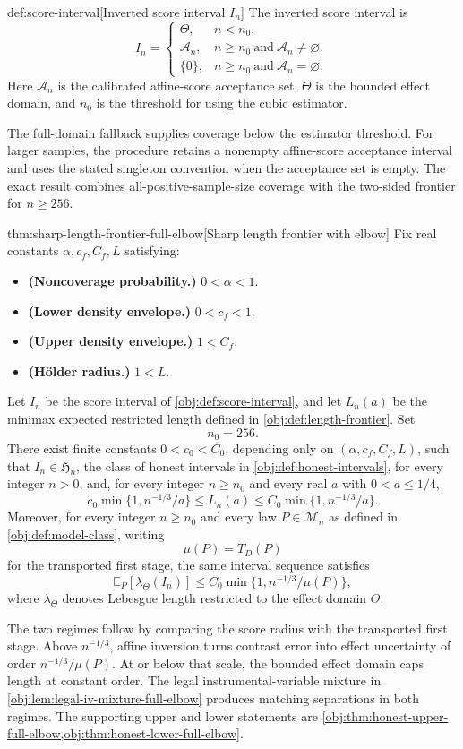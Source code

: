 \begin{definitionv}{def:score-interval}[Inverted score interval \(I_n\)]
The inverted score interval is
\[
I_n=
\begin{cases}
\Theta,& n<n_0,\\
\mathcal A_n,& n\ge n_0\ \text{and}\ \mathcal A_n\ne\varnothing,\\
\{0\},& n\ge n_0\ \text{and}\ \mathcal A_n=\varnothing.
\end{cases}
\]
Here \(\mathcal A_n\) is the calibrated affine-score acceptance set, \(\Theta\) is the bounded effect domain, and \(n_0\) is the threshold for using the cubic estimator.
\end{definitionv}

The full-domain fallback supplies coverage below the estimator threshold. For larger samples, the procedure retains a nonempty affine-score acceptance interval and uses the stated singleton convention when the acceptance set is empty. The exact result combines all-positive-sample-size coverage with the two-sided frontier for \(n\ge256\).

\begin{theoremv}{thm:sharp-length-frontier-full-elbow}[Sharp length frontier with elbow]
Fix real constants \(\alpha,c_f,C_f,L\) satisfying:
\begin{itemize}
\item \textbf{(Noncoverage probability.)} \(0<\alpha<1\).
\item \textbf{(Lower density envelope.)} \(0<c_f<1\).
\item \textbf{(Upper density envelope.)} \(1<C_f\).
\item \textbf{(Hölder radius.)} \(1<L\).
\end{itemize}
Let \(I_n\) be the score interval of \cref{obj:def:score-interval}, and let \(L_n(a)\) be the minimax expected restricted length defined in \cref{obj:def:length-frontier}. Set
\[
n_0=256.
\]
There exist finite constants \(0<c_0<C_0\), depending only on \((\alpha,c_f,C_f,L)\), such that \(I_n\in\mathfrak H_n\), the class of honest intervals in \cref{obj:def:honest-intervals}, for every integer \(n>0\), and, for every integer \(n\ge n_0\) and every real \(a\) with \(0<a\le 1/4\),
\[
c_0\min\{1,n^{-1/3}/a\}
\le L_n(a)
\le C_0\min\{1,n^{-1/3}/a\}.
\]
Moreover, for every integer \(n\ge n_0\) and every law \(P\in\mathcal M_n\) as defined in \cref{obj:def:model-class}, writing
\[
\mu(P)=T_D(P)
\]
for the transported first stage, the same interval sequence satisfies
\[
\mathbb E_P\!\left[\lambda_{\Theta}(I_n)\right]
\le C_0\min\{1,n^{-1/3}/\mu(P)\},
\]
where \(\lambda_{\Theta}\) denotes Lebesgue length restricted to the effect domain \(\Theta\).
\end{theoremv}

The two regimes follow by comparing the score radius with the transported first stage. Above \(n^{-1/3}\), affine inversion turns contrast error into effect uncertainty of order \(n^{-1/3}/\mu(P)\). At or below that scale, the bounded effect domain caps length at constant order. The legal instrumental-variable mixture in \cref{obj:lem:legal-iv-mixture-full-elbow} produces matching separations in both regimes. The supporting upper and lower statements are \cref{obj:thm:honest-upper-full-elbow,obj:thm:honest-lower-full-elbow}.
